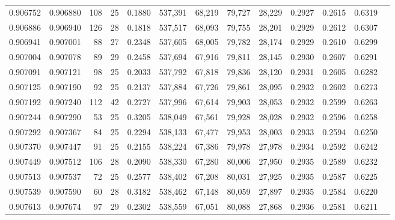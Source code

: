 \begin{tabular}{rrrrrrrrrrrrr}
0.906752 & 0.906880 &   108 &  25 &                                     0.1880 & 537,391 &  68,219 &  79,727 &  28,229 & 0.2927 & 0.2615 & 0.6319 \\
0.906886 & 0.906940 &   126 &  28 &                                     0.1818 & 537,517 &  68,093 &  79,755 &  28,201 & 0.2929 & 0.2612 & 0.6307 \\
0.906941 & 0.907001 &    88 &  27 &                                     0.2348 & 537,605 &  68,005 &  79,782 &  28,174 & 0.2929 & 0.2610 & 0.6299 \\
0.907004 & 0.907078 &    89 &  29 &                                     0.2458 & 537,694 &  67,916 &  79,811 &  28,145 & 0.2930 & 0.2607 & 0.6291 \\
0.907091 & 0.907121 &    98 &  25 &                                     0.2033 & 537,792 &  67,818 &  79,836 &  28,120 & 0.2931 & 0.2605 & 0.6282 \\
0.907125 & 0.907190 &    92 &  25 &                                     0.2137 & 537,884 &  67,726 &  79,861 &  28,095 & 0.2932 & 0.2602 & 0.6273 \\
0.907192 & 0.907240 &   112 &  42 &                                     0.2727 & 537,996 &  67,614 &  79,903 &  28,053 & 0.2932 & 0.2599 & 0.6263 \\
0.907244 & 0.907290 &    53 &  25 &                                     0.3205 & 538,049 &  67,561 &  79,928 &  28,028 & 0.2932 & 0.2596 & 0.6258 \\
0.907292 & 0.907367 &    84 &  25 &                                     0.2294 & 538,133 &  67,477 &  79,953 &  28,003 & 0.2933 & 0.2594 & 0.6250 \\
0.907370 & 0.907447 &    91 &  25 &                                     0.2155 & 538,224 &  67,386 &  79,978 &  27,978 & 0.2934 & 0.2592 & 0.6242 \\
0.907449 & 0.907512 &   106 &  28 &                                     0.2090 & 538,330 &  67,280 &  80,006 &  27,950 & 0.2935 & 0.2589 & 0.6232 \\
0.907513 & 0.907537 &    72 &  25 &                                     0.2577 & 538,402 &  67,208 &  80,031 &  27,925 & 0.2935 & 0.2587 & 0.6225 \\
0.907539 & 0.907590 &    60 &  28 &                                     0.3182 & 538,462 &  67,148 &  80,059 &  27,897 & 0.2935 & 0.2584 & 0.6220 \\
0.907613 & 0.907674 &    97 &  29 &                                     0.2302 & 538,559 &  67,051 &  80,088 &  27,868 & 0.2936 & 0.2581 & 0.6211 \\

\end{tabular}
